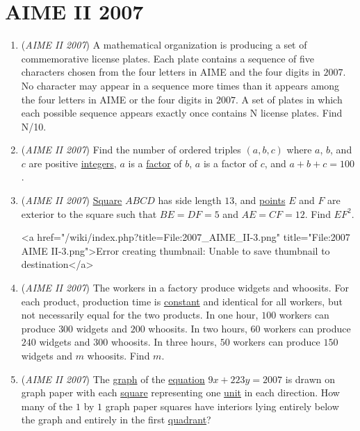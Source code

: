 \section{AIME II 2007}
        \begin{enumerate}
        	\item (\textit{AIME II 2007}) A mathematical organization is producing a set of commemorative license plates. Each plate contains a sequence of five characters chosen from the four letters in AIME and the four digits in $2007$. No character may appear in a sequence more times than it appears among the four letters in AIME or the four digits in $2007$. A set of plates in which each possible sequence appears exactly once contains N license plates. Find N/10.


 

	\item (\textit{AIME II 2007}) Find the number of ordered triples $(a,b,c)$ where $a$, $b$, and $c$ are positive \href{https://artofproblemsolving.com/wiki/index.php?title=Integer}{integers}, $a$ is a \href{https://artofproblemsolving.com/wiki/index.php?title=Factor}{factor} of $b$, $a$ is a factor of $c$, and $a+b+c=100$.


 

	\item (\textit{AIME II 2007}) \href{https://artofproblemsolving.com/wiki/index.php?title=Square}{Square} $ABCD$ has side length $13$, and \href{https://artofproblemsolving.com/wiki/index.php?title=Point}{points} $E$ and $F$ are exterior to the square such that $BE=DF=5$ and $AE=CF=12$. Find $EF^{2}$.


 <a href="/wiki/index.php?title=File:2007\_AIME\_II-3.png" title="File:2007 AIME II-3.png">Error creating thumbnail: Unable to save thumbnail to destination</a>

	\item (\textit{AIME II 2007}) The workers in a factory produce widgets and whoosits. For each product, production time is \href{https://artofproblemsolving.com/wiki/index.php?title=Constant}{constant} and identical for all workers, but not necessarily equal for the two products. In one hour, $100$ workers can produce $300$ widgets and $200$ whoosits. In two hours, $60$ workers can produce $240$ widgets and $300$ whoosits. In three hours, $50$ workers can produce $150$ widgets and $m$ whoosits. Find $m$.


 

	\item (\textit{AIME II 2007}) The \href{https://artofproblemsolving.com/wiki/index.php?title=Graph}{graph} of the \href{https://artofproblemsolving.com/wiki/index.php?title=Equation}{equation} $9x+223y=2007$ is drawn on graph paper with each \href{https://artofproblemsolving.com/wiki/index.php?title=Square}{square} representing one \href{https://artofproblemsolving.com/wiki/index.php?title=Unit\_square}{unit} in each direction. How many of the $1$ by $1$ graph paper squares have interiors lying entirely below the graph and entirely in the first \href{https://artofproblemsolving.com/wiki/index.php?title=Quadrant}{quadrant}?



\end{enumerate}
